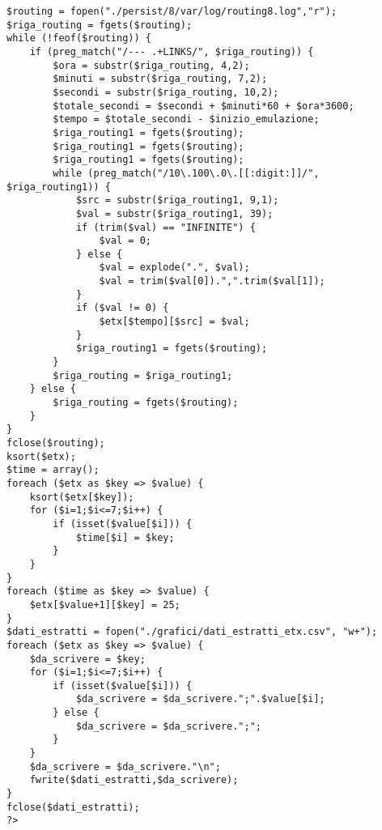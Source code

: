 \begin{lstlisting}
$routing = fopen("./persist/8/var/log/routing8.log","r");
$riga_routing = fgets($routing);
while (!feof($routing)) {
	if (preg_match("/--- .+LINKS/", $riga_routing)) {
		$ora = substr($riga_routing, 4,2);
		$minuti = substr($riga_routing, 7,2);
		$secondi = substr($riga_routing, 10,2);
		$totale_secondi = $secondi + $minuti*60 + $ora*3600;
		$tempo = $totale_secondi - $inizio_emulazione;
		$riga_routing1 = fgets($routing);
		$riga_routing1 = fgets($routing);
		$riga_routing1 = fgets($routing);
		while (preg_match("/10\.100\.0\.[[:digit:]]/", $riga_routing1)) {
			$src = substr($riga_routing1, 9,1);
			$val = substr($riga_routing1, 39);
			if (trim($val) == "INFINITE") {
				$val = 0;
			} else {
				$val = explode(".", $val);
				$val = trim($val[0]).",".trim($val[1]);
			}
			if ($val != 0) {
				$etx[$tempo][$src] = $val;
			}
			$riga_routing1 = fgets($routing);
		}
		$riga_routing = $riga_routing1;
	} else {
		$riga_routing = fgets($routing);
	}
}
fclose($routing);
ksort($etx);
$time = array();
foreach ($etx as $key => $value) {
	ksort($etx[$key]);
	for ($i=1;$i<=7;$i++) {
		if (isset($value[$i])) {
			$time[$i] = $key;
		}
	}
}
foreach ($time as $key => $value) {
	$etx[$value+1][$key] = 25;
}
$dati_estratti = fopen("./grafici/dati_estratti_etx.csv", "w+");
foreach ($etx as $key => $value) {
	$da_scrivere = $key;
	for ($i=1;$i<=7;$i++) {
		if (isset($value[$i])) {
			$da_scrivere = $da_scrivere.";".$value[$i];
		} else {
			$da_scrivere = $da_scrivere.";";
		}
	}
	$da_scrivere = $da_scrivere."\n";
	fwrite($dati_estratti,$da_scrivere);
}
fclose($dati_estratti);
?>
\end{lstlisting}
